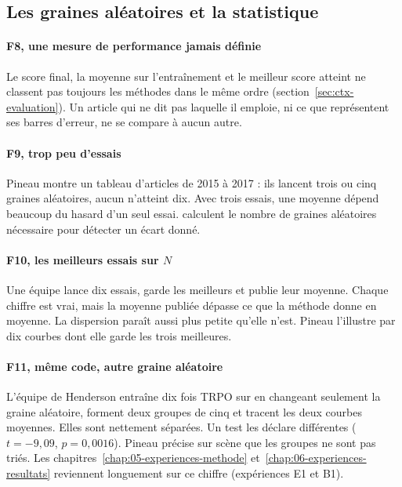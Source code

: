 \subsection{Les graines aléatoires et la statistique}

\paragraph{F8, une mesure de performance jamais définie}
Le score final, la moyenne sur l'entraînement et le meilleur score atteint ne classent pas toujours les
méthodes dans le même ordre (section~\ref{sec:ctx-evaluation}). Un article qui ne dit pas laquelle il emploie, ni
ce que représentent ses barres d'erreur, ne se compare à aucun autre.

\paragraph{F9, trop peu d'essais}
Pineau montre un tableau d'articles de 2015 à 2017 : ils lancent trois ou cinq graines aléatoires,
aucun n'atteint dix. Avec trois essais, une moyenne dépend beaucoup du hasard d'un seul essai.
\textcite{colas2018seeds} calculent le nombre de graines aléatoires nécessaire pour détecter un écart donné.

\paragraph{F10, les meilleurs essais sur $N$}
Une équipe lance dix essais, garde les meilleurs et publie leur moyenne. Chaque chiffre est vrai, mais
la moyenne publiée dépasse ce que la méthode donne en moyenne. La dispersion paraît aussi plus petite
qu'elle n'est. Pineau l'illustre par dix courbes dont elle garde les trois meilleures.

\paragraph{F11, même code, autre graine aléatoire}
L'équipe de Henderson entraîne dix fois TRPO sur  en changeant seulement la
graine aléatoire, forment deux groupes de cinq et tracent les deux courbes moyennes. Elles sont
nettement séparées. Un test les déclare différentes ($t = -9{,}09$, $p = 0{,}0016$). Pineau précise
sur scène que les groupes ne sont pas triés. Les chapitres~\ref{chap:05-experiences-methode} et~\ref{chap:06-experiences-resultats}
reviennent longuement sur ce chiffre (expériences E1 et B1).

